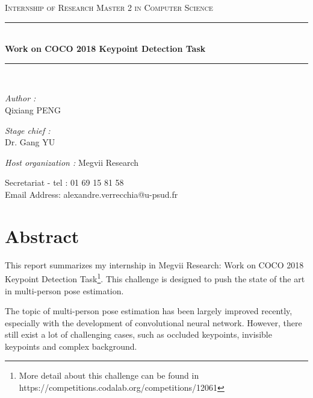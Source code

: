 \documentclass[oneside]{memoir}
\newcommand{\HRule}{\rule{\linewidth}{0.5mm}}
\begin{document}
\begin{titlingpage}
\begin{center}
\vspace{2cm}
\textsc{\Large Internship of Research Master 2 in Computer Science}\\[0.5cm]


\HRule \\[0.4cm]
{ \huge \bfseries Work on COCO 2018 Keypoint Detection Task}\\[0.4cm]

\HRule \\[1.5cm]

\begin{minipage}{0.4\textwidth}
\begin{flushleft} \large
\emph{Author :}\\
Qixiang \textsc{PENG}
\end{flushleft}
\end{minipage}
\begin{minipage}{0.4\textwidth}
\begin{flushright} \large
\emph{Stage chief :} \\
Dr. Gang \textsc{YU}
\end{flushright}
\end{minipage}
\vfill
\emph{Host organization : }
Megvii Research


\vfill



{Secretariat - tel : 01 69 15 81 58\\
Email Address: alexandre.verrecchia@u-psud.fr\\
}
\end{center}

\end{titlingpage}



\tableofcontents

\newpage
\thispagestyle{empty}%
\newpage

\chapter*{Abstract}

This report summarizes my internship in Megvii Research: Work on COCO 2018 Keypoint Detection Task\footnote{ More detail about this challenge can be found in https://competitions.codalab.org/competitions/12061}.
This challenge is designed to push the state of the art in multi-person pose estimation.

The topic of multi-person pose estimation has been largely improved recently, especially with the development of convolutional neural network.
However, there still exist a lot of challenging cases, such as occluded keypoints, invisible keypoints and complex background.
\end{document}
